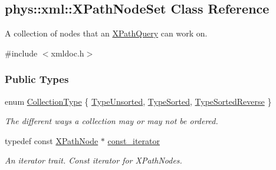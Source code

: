 \hypertarget{classphys_1_1xml_1_1XPathNodeSet}{
\subsection{phys::xml::XPathNodeSet Class Reference}
\label{de/dc2/classphys_1_1xml_1_1XPathNodeSet}
}


A collection of nodes that an \hyperlink{classphys_1_1xml_1_1XPathQuery}{XPathQuery} can work on.  




{\ttfamily \#include $<$xmldoc.h$>$}

\subsubsection*{Public Types}
\begin{DoxyCompactItemize}
\item 
enum \hyperlink{classphys_1_1xml_1_1XPathNodeSet_ab178d39e119369702541033c067a995c}{CollectionType} \{ \hyperlink{classphys_1_1xml_1_1XPathNodeSet_ab178d39e119369702541033c067a995ca8f4fe063043fb03da3c074b4c6c7879c}{TypeUnsorted}, 
\hyperlink{classphys_1_1xml_1_1XPathNodeSet_ab178d39e119369702541033c067a995ca1a79973b465ba264dfaae55836121be2}{TypeSorted}, 
\hyperlink{classphys_1_1xml_1_1XPathNodeSet_ab178d39e119369702541033c067a995caea04d0c99f11c8b4deeccb6316911420}{TypeSortedReverse}
 \}
\begin{DoxyCompactList}\small\item\em The different ways a collection may or may not be ordered. \item\end{DoxyCompactList}\item 
\hypertarget{classphys_1_1xml_1_1XPathNodeSet_a64ed5a3479ae329b0753354dcceba7d3}{
typedef const \hyperlink{classphys_1_1xml_1_1XPathNode}{XPathNode} $\ast$ \hyperlink{classphys_1_1xml_1_1XPathNodeSet_a64ed5a3479ae329b0753354dcceba7d3}{const\_\-iterator}}
\label{de/dc2/classphys_1_1xml_1_1XPathNodeSet_a64ed5a3479ae329b0753354dcceba7d3}

\begin{DoxyCompactList}\small\item\em An iterator trait. Const iterator for XPathNodes. \item\end{DoxyCompactList}\end{DoxyCompactItemize}
